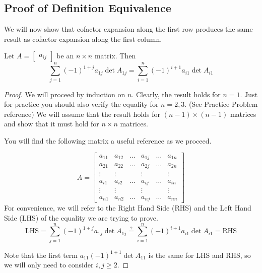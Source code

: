 \documentclass{ximera}
\begin{document}
\subsection*{Proof of Definition Equivalence}
We will now show that cofactor expansion along the first row produces the same result as cofactor expansion along the first column.
\begin{theorem}\label{th:rowcolexpequivalence}
Let $A=\begin{bmatrix}a_{ij}\end{bmatrix}$ be an $n\times n$ matrix.  Then
$$\sum_{j=1}^n(-1)^{1+j}a_{1j}\det{A_{1j}}=\sum_{i=1}^n(-1)^{i+1}a_{i1}\det{A_{i1}}$$
\end{theorem}
\begin{proof}
We will proceed by induction on $n$.  Clearly, the result holds for $n=1$.  Just for practice you should also verify the equality for $n=2, 3$. (See Practice Problem {\color{red} reference})  We will assume that the result holds for $(n-1)\times (n-1)$ matrices and show that it must hold for $n\times n$ matrices.

You will find the following matrix a useful reference as we proceed.

$$A=\begin{bmatrix}a_{11} & a_{12} & \dots &  a_{1j} &  \dots & a_{1n}  \\
    a_{21} & a_{22} & \dots &  a_{2j} &  \dots & a_{2n}  \\
   \vdots & \vdots &  & \vdots &   & \vdots  \\
  a_{i1} & a_{i2} & \ldots &  a_{ij} &  \ldots & a_{in}\\
  \vdots & \vdots &  & \vdots &   & \vdots  \\
   a_{n1} & a_{n2} & \dots &  a_{nj} &  \dots & a_{nn}\end{bmatrix}$$
   For convenience, we will refer to the Right Hand Side (RHS) and the Left Hand Side (LHS) of the equality we are trying to prove.
   $$\text{LHS}=\sum_{j=1}^n(-1)^{1+j}a_{1j}\det{A_{1j}}\overset{?}{=}\sum_{i=1}^n(-1)^{i+1}a_{i1}\det{A_{i1}}=\text{RHS}$$
   
   Note that the first term $a_{11}(-1)^{1+1}\det{A_{11}}$ is the same for LHS and RHS, so we will only need to consider $i,j\geq 2$.
   

\end{proof}
\end{document}
